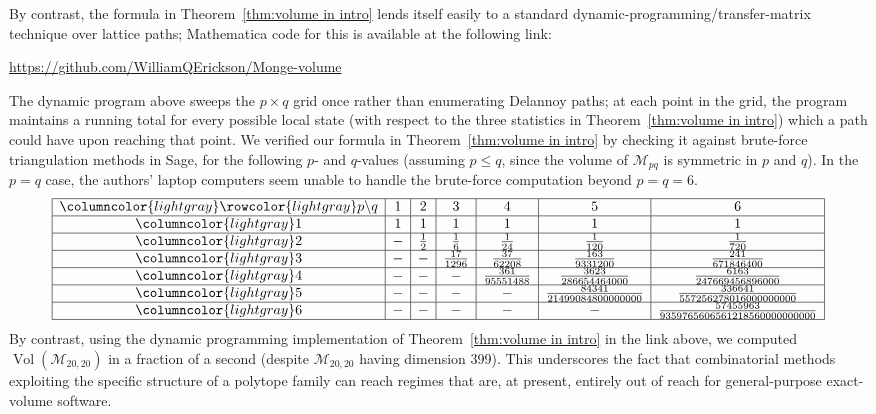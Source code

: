 \documentclass[noamsfonts,10pt]{amsart}
\newcommand{\M}{\mathcal{M}}
\DeclareMathOperator{\Vol}{Vol}
\newcommand{\1}{\mathbf{1}}
\theoremstyle{plain}
\theoremstyle{definition}
\numberwithin{equation}{section}
\begin{document}
By contrast, the formula in Theorem~\ref{thm:volume in intro} lends itself easily to a standard dynamic-programming/transfer-matrix technique over lattice paths;
Mathematica code for this is available at the following link:
\begin{center}
    \url{https://github.com/WilliamQErickson/Monge-volume}
\end{center}
The dynamic program above sweeps the $p\times q$ grid once rather than enumerating Delannoy paths;
at each point in the grid, the program maintains a running  total for every possible local state (with respect to the three statistics in Theorem~\ref{thm:volume in intro}) which a path could have upon reaching that point.
We verified our formula in Theorem~\ref{thm:volume in intro} by checking it against brute-force triangulation methods in Sage, for the following $p$- and $q$-values (assuming $p \leq q$, since the volume of $\M_{pq}$ is symmetric in $p$ and $q$).
In the $p=q$ case, the authors' laptop computers seem unable to handle the brute-force computation beyond $p=q=6$.
\begingroup
\renewcommand{\arraystretch}{1.5}
\[
    \begin{array}{|>{\columncolor{lightgray}}c |c|c|c|c|c|c|c|}
    \hline
    \rowcolor{lightgray} p \backslash q & 1 & 2 & 3 & 4 & 5 & 6  \\ \hline
    1 & 1 & 1 & 1 & 1 & 1 & 1  \\ \hline
    2 & - & \frac{1}{2} & \frac{1}{6} & \frac{1}{24} & \frac{1}{120} & \frac{1}{720} \\ \hline
    3 & - & - & \frac{17}{1296} & \frac{37}{62208} & \frac{163}{9331200} & \frac{241}{671846400} \\ \hline
    4 & - & - & - & \frac{361}{95551488} & \frac{3623}{286654464000} & \frac{6163}{247669456896000} \\ \hline
    5 & - & - & - & - & \frac{84341}{21499084800000000} & \frac{336641}{557256278016000000000} \\ \hline
    6 & - & - & - & - & - & \frac{57455963}{9359765606561218560000000000} \\ \hline
    \end{array}
\]
\endgroup
By contrast, using the dynamic programming implementation of Theorem~\ref{thm:volume in intro} in the link above, we computed $\Vol(\M_{20,20})$ in a fraction of a second (despite $\M_{20,20}$ having dimension 399).
This underscores the fact that combinatorial methods exploiting the specific structure of a polytope family can reach regimes that are, at present, entirely out of reach for general-purpose exact-volume software.
\end{document}
